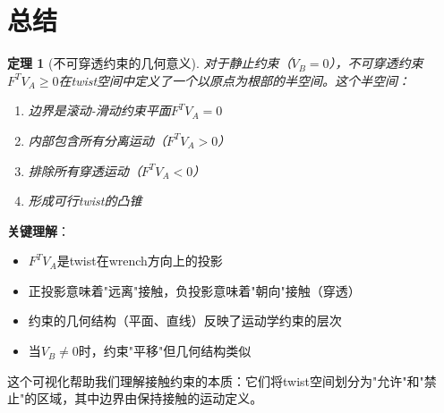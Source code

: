 \documentclass[12pt,a4paper]{article}
\newtheorem{theorem}{定理}
\begin{document}
\section{总结}

\begin{theorem}[不可穿透约束的几何意义]
对于静止约束（$V_B = 0$），不可穿透约束$F^T V_A \geq 0$在twist空间中定义了一个以原点为根部的半空间。这个半空间：

\begin{enumerate}
\item 边界是滚动-滑动约束平面$F^T V_A = 0$
\item 内部包含所有分离运动（$F^T V_A > 0$）
\item 排除所有穿透运动（$F^T V_A < 0$）
\item 形成可行twist的凸锥
\end{enumerate}
\end{theorem}

\textbf{关键理解}：
\begin{itemize}
\item $F^T V_A$是twist在wrench方向上的投影
\item 正投影意味着"远离"接触，负投影意味着"朝向"接触（穿透）
\item 约束的几何结构（平面、直线）反映了运动学约束的层次
\item 当$V_B \neq 0$时，约束"平移"但几何结构类似
\end{itemize}

这个可视化帮助我们理解接触约束的本质：它们将twist空间划分为"允许"和"禁止"的区域，其中边界由保持接触的运动定义。
\end{document}
